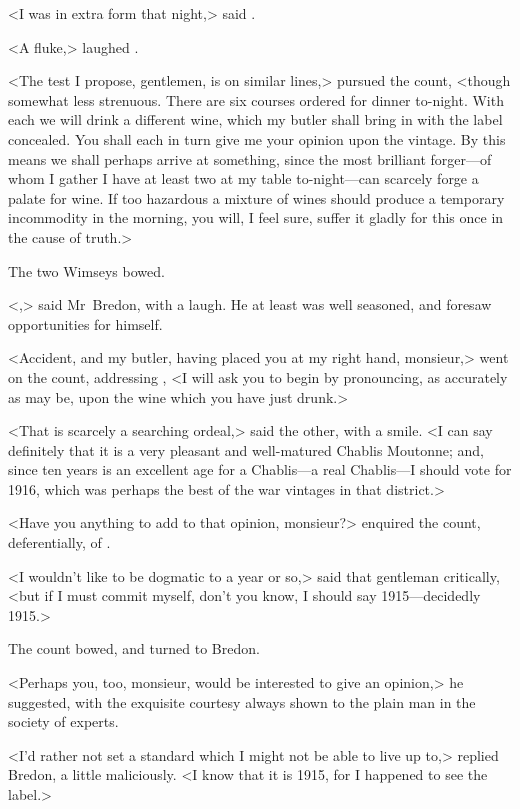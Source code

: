 <I was in extra form that night,> said .

<A fluke,> laughed .

<The test I propose, gentlemen, is on similar lines,> pursued the count, <though somewhat less strenuous. There are six courses ordered for dinner to-night. With each we will drink a different wine, which my butler shall bring in with the label concealed. You shall each in turn give me your opinion upon the vintage. By this means we shall perhaps arrive at something, since the most brilliant forger—of whom I gather I have at least two at my table to-night—can scarcely forge a palate for wine. If too hazardous a mixture of wines should produce a temporary incommodity in the morning, you will, I feel sure, suffer it gladly for this once in the cause of truth.>

The two Wimseys bowed.

<,> said Mr~Bredon, with a laugh. He at least was well seasoned, and foresaw opportunities for himself.

<Accident, and my butler, having placed you at my right hand, monsieur,> went on the count, addressing , <I will ask you to begin by pronouncing, as accurately as may be, upon the wine which you have just drunk.>

<That is scarcely a searching ordeal,> said the other, with a smile. <I can say definitely that it is a very pleasant and well-matured Chablis Moutonne; and, since ten years is an excellent age for a Chablis—a real Chablis—I should vote for 1916, which was perhaps the best of the war vintages in that district.>

<Have you anything to add to that opinion, monsieur?> enquired the count, deferentially, of .

<I wouldn't like to be dogmatic to a year or so,> said that gentleman critically, <but if I must commit myself, don't you know, I should say 1915—decidedly 1915.>

The count bowed, and turned to Bredon.

<Perhaps you, too, monsieur, would be interested to give an opinion,> he suggested, with the exquisite courtesy always shown to the plain man in the society of experts.

<I'd rather not set a standard which I might not be able to live up to,> replied Bredon, a little maliciously. <I know that it is 1915, for I happened to see the label.>

